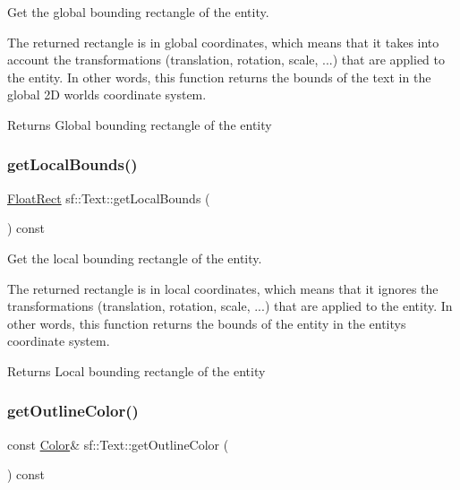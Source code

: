 Get the global bounding rectangle of the entity. 

The returned rectangle is in global coordinates, which means that it takes into account the transformations (translation, rotation, scale, ...) that are applied to the entity. In other words, this function returns the bounds of the text in the global 2D world\textquotesingle{}s coordinate system.

\begin{DoxyReturn}{Returns}
Global bounding rectangle of the entity 
\end{DoxyReturn}
\mbox{\label{classsf_1_1_text_a3e6b3b298827f853b41165eee2cbbc66}} 
\subsubsection{\texorpdfstring{get\+Local\+Bounds()}{getLocalBounds()}}
{\footnotesize\ttfamily \hyperlink{classsf_1_1_rect}{Float\+Rect} sf\+::\+Text\+::get\+Local\+Bounds (\begin{DoxyParamCaption}{ }\end{DoxyParamCaption}) const}



Get the local bounding rectangle of the entity. 

The returned rectangle is in local coordinates, which means that it ignores the transformations (translation, rotation, scale, ...) that are applied to the entity. In other words, this function returns the bounds of the entity in the entity\textquotesingle{}s coordinate system.

\begin{DoxyReturn}{Returns}
Local bounding rectangle of the entity 
\end{DoxyReturn}
\mbox{\label{classsf_1_1_text_a53559d563461089f1172571b375442dc}} 
\subsubsection{\texorpdfstring{get\+Outline\+Color()}{getOutlineColor()}}
{\footnotesize\ttfamily const \hyperlink{classsf_1_1_color}{Color}\& sf\+::\+Text\+::get\+Outline\+Color (\begin{DoxyParamCaption}{ }\end{DoxyParamCaption}) const}



